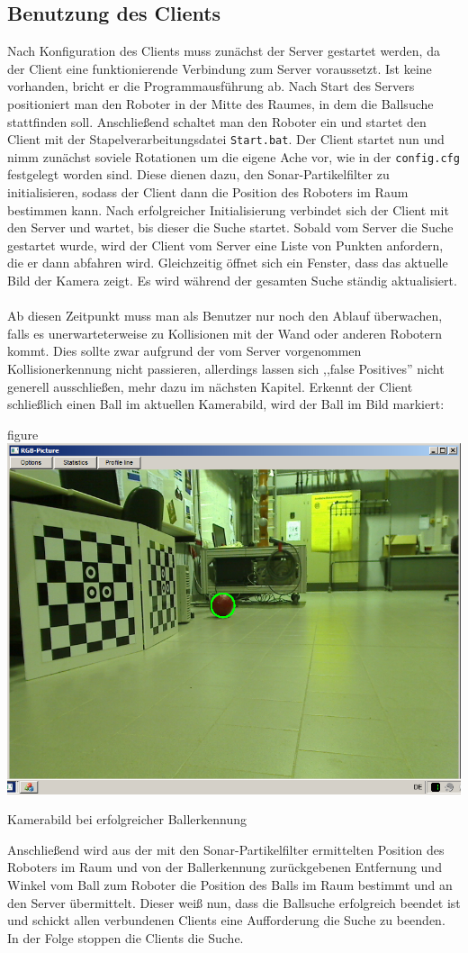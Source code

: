 
\subsection{Benutzung des Clients}
\label{sec:benutz-des-clients}
Nach Konfiguration des Clients muss zunächst der Server gestartet
werden, da der Client eine funktionierende Verbindung zum Server
voraussetzt. Ist keine vorhanden, bricht er die Programmausführung ab.
Nach Start des Servers  positioniert man den Roboter in der Mitte des
Raumes, in dem die Ballsuche stattfinden soll. Anschließend schaltet
man den Roboter ein und startet den Client mit der
Stapelverarbeitungsdatei \verb|Start.bat|. Der Client startet nun und
nimm zunächst soviele Rotationen um die eigene Ache vor, wie in der
\verb|config.cfg| festgelegt worden sind. Diese dienen dazu, den
Sonar-Partikelfilter zu initialisieren, sodass der Client dann die
Position des Roboters im Raum bestimmen kann. Nach erfolgreicher
Initialisierung verbindet sich der Client mit den Server und wartet,
bis dieser die Suche startet. Sobald vom Server die Suche gestartet
wurde, wird der Client vom Server eine Liste von Punkten anfordern,
die er dann abfahren wird. Gleichzeitig öffnet sich ein Fenster, dass
das aktuelle Bild der Kamera zeigt. Es wird während der gesamten Suche
ständig aktualisiert. \\\\
Ab diesen Zeitpunkt muss man als Benutzer
nur noch den Ablauf überwachen, falls es unerwarteterweise zu
Kollisionen mit der Wand oder anderen Robotern kommt. Dies sollte zwar
aufgrund der vom Server vorgenommen Kollisionerkennung nicht
passieren, allerdings lassen sich ,,false Positives'' nicht generell
ausschließen, mehr dazu im nächsten Kapitel. Erkennt der Client
schließlich einen Ball im aktuellen Kamerabild, wird der Ball im Bild
markiert:
\begin{nofloat}{figure}\centering
\includegraphics[width=0.75\linewidth]{bilder/balldetect}
\caption{Kamerabild bei erfolgreicher Ballerkennung}  
\end{nofloat}

Anschließend wird aus der mit den Sonar-Partikelfilter ermittelten
Position des Roboters im Raum und von der Ballerkennung zurückgebenen
Entfernung und Winkel vom Ball zum Roboter die Position des Balls im
Raum bestimmt und an den Server übermittelt. Dieser weiß nun, dass die
Ballsuche erfolgreich beendet ist und schickt allen verbundenen
Clients eine Aufforderung die Suche zu beenden. In der Folge stoppen
die Clients die Suche.
